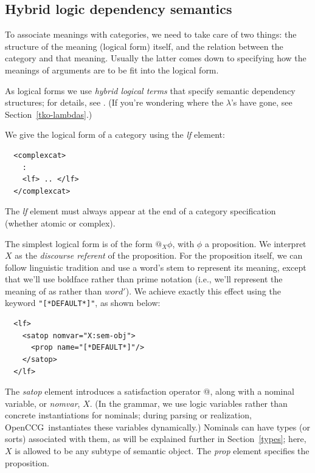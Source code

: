 \documentclass[11pt]{article}
\newcommand{\occg}{OpenCCG}
\begin{document}
\subsection{Hybrid logic dependency semantics}

To associate meanings with categories, we need to take care of two
things: the structure of the meaning (logical form) itself, and the
relation between the category and that meaning. Usually the latter comes
down to specifying how the meanings of arguments are to be fit into the
logical form.

As logical forms we use \emph{hybrid logical terms} that specify
semantic dependency structures; for details, see
\cite{Kruijff:2001,Baldridge/Kruijff:2002,White/Baldridge:2003,White-RLAC:2004}.
(If you're wondering where the $\lambda$'s have gone, see
Section~\ref{tko-lambdas}.)

We give the logical form of a category using the \textsl{lf} element:

\begin{verbatim}
  <complexcat>
    :
    <lf> .. </lf>
  </complexcat>
\end{verbatim}

\noindent The \textsl{lf} element must always appear at the end of a
category specification (whether atomic or complex).

The simplest logical form is of the form $@_{X} \phi$, with $\phi$ a
proposition. We interpret $X$ as the \emph{discourse referent} of the
proposition. For the proposition itself, we can follow linguistic
tradition and use a word's stem to represent its meaning, except that
we'll use boldface rather than prime notation (i.e., we'll represent the
meaning of  as  rather than $\mathit{word}'$). We
achieve exactly this effect using the keyword \texttt{"[*DEFAULT*]"}, as
shown below:

\begin{verbatim}
  <lf>
    <satop nomvar="X:sem-obj"> 
      <prop name="[*DEFAULT*]"/> 
    </satop>
  </lf>
\end{verbatim}

\noindent The \textsl{satop} element introduces a satisfaction operator
@, along with a nominal variable, or \textsl{nomvar}, $X$. (In the
grammar, we use logic variables rather than concrete instantiations for
nominals; during parsing or realization, \occg\ instantiates these
variables dynamically.) Nominals can have types (or sorts) associated
with them, as will be explained further in Section~\ref{types}; here,
$X$ is allowed to be any subtype of semantic object. The \textsl{prop}
element specifies the proposition.
\end{document}
